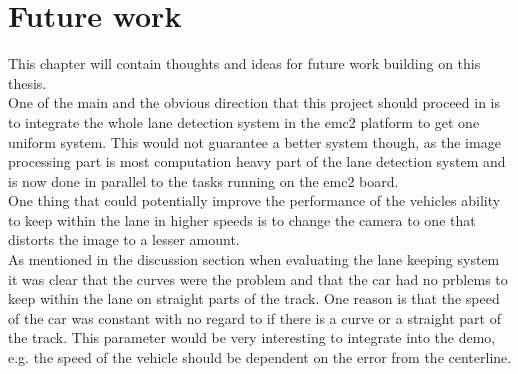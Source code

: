 \chapter{Future work}
This chapter will contain thoughts and ideas for future work building on this thesis.\\

One of the main and the obvious direction that this project should proceed in is to integrate the whole lane detection system in the emc2 platform to get one uniform system. This would not guarantee a better system though, as the image processing part is most computation heavy part of the lane detection system and is now done in parallel to the tasks running on the emc2 board.\\

One thing that could potentially improve the performance of the vehicles ability to keep within the lane in higher speeds is to change the camera to one that distorts the image to a lesser amount.\\

As mentioned in the discussion section when evaluating the lane keeping system it was clear that the curves were the problem and that the car had no prblems to keep within the lane on straight parts of the track. One reason is that the speed of the car was constant with no regard to if there is a curve or a straight part of the track. This parameter would be very interesting to integrate into the demo, e.g. the speed of the vehicle should be dependent on the error from the centerline.